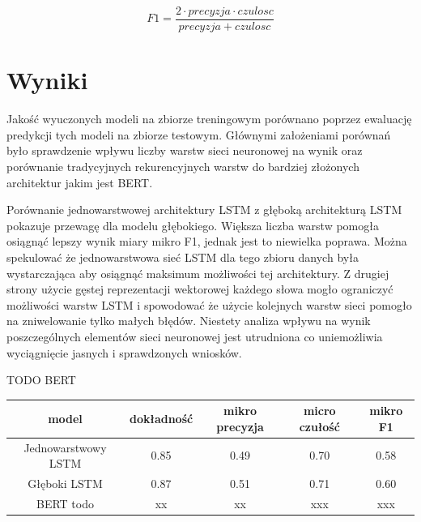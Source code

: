 \begin{equation}
\label{eqn:f1}
F1 = \frac{2 \cdot precyzja\cdot czulosc}{precyzja + czulosc}
\end{equation}

\section{Wyniki}

Jakość wyuczonych modeli na zbiorze treningowym porównano poprzez ewaluację predykcji tych modeli na zbiorze testowym. Głównymi założeniami porównań było sprawdzenie wpływu liczby warstw sieci neuronowej na wynik oraz porównanie tradycyjnych rekurencyjnych warstw do bardziej złożonych architektur jakim jest BERT. 

Porównanie jednowarstwowej architektury LSTM  z głęboką architekturą LSTM pokazuje przewagę dla modelu głębokiego. Większa liczba warstw pomogła osiągnąć lepszy wynik miary mikro F1, jednak jest to niewielka poprawa. Można spekulować że jednowarstwowa sieć LSTM dla tego zbioru danych była wystarczająca aby osiągnąć maksimum możliwości tej architektury. Z drugiej strony użycie gęstej reprezentacji wektorowej każdego słowa mogło ograniczyć możliwości warstw LSTM i spowodować że użycie kolejnych warstw sieci pomogło na zniwelowanie tylko małych błędów. Niestety analiza wpływu na wynik poszczególnych elementów sieci neuronowej jest utrudniona co uniemożliwia wyciągnięcie jasnych i sprawdzonych wniosków.

TODO BERT

\begin{table}[ht]
\label{tab:tabela_results}
\centering\footnotesize%
\begin{tabular}{c c c c c}
\toprule
model & dokładność & mikro precyzja & micro czułość & mikro F1 \\
\midrule
Jednowarstwowy LSTM   & 0.85 & 0.49 & 0.70 & 0.58 \\
Głęboki LSTM   & 0.87 & 0.51 & 0.71 & 0.60 \\
BERT todo   & xx & xx & xxx & xxx \\
\bottomrule
\end{tabular}
\end{table}